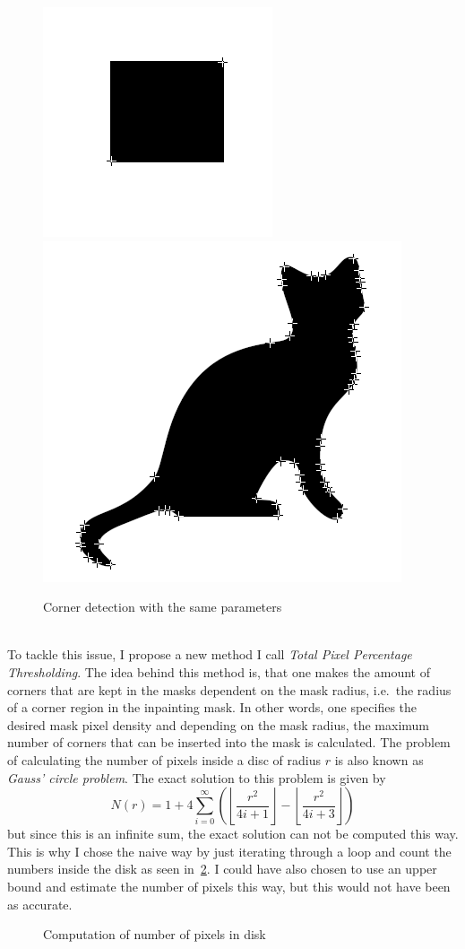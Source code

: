 \begin{figure}[h!]
    \centering
    \includegraphics[width=0.4\linewidth]{../Images/example_rect_50.png}
    \includegraphics[width=0.4\linewidth]{../Images/example_cat_50.png}
    \caption{Corner detection with the same parameters}%
    \label{fig:PercExample}
\end{figure}\\
To tackle this issue, I propose a new method I call \textit{Total Pixel Percentage
Thresholding}. The idea behind this method is, that one makes the amount of corners that are kept
in the masks dependent on the mask radius, i.e.\ the radius of a corner region in the inpainting
mask. In other words, one specifies the desired mask pixel density and depending on the mask
radius, the maximum number of corners that can be inserted into the mask is calculated.
The problem of calculating the number of pixels inside a disc of radius $r$ is also known as
\textit{Gauss' circle problem}\cite{gaussCircle}. The exact solution to this problem is given
by\cite{hilbert96}
\begin{equation}
    N(r) = 1 + 4\sum_{i=0}^{\infty}\left(\left\lfloor\frac{r^2}{4i+1}\right\rfloor - \left\lfloor
    \frac{r^2}{4i+3}\right\rfloor\right)
\end{equation}
but since this is an infinite sum, the exact solution can not be computed this way. This is why I
chose the naive way by just iterating through a loop and count the numbers inside the disk as seen
in~\ref{fig:PixelRegion}. 
I could have also chosen to use an upper bound and estimate the number of pixels this way, but this
would not have been as accurate.
\begin{figure}[ht]
    \centering
    
    \caption{Computation of number of pixels in disk}\label{fig:PixelRegion}
\end{figure}

